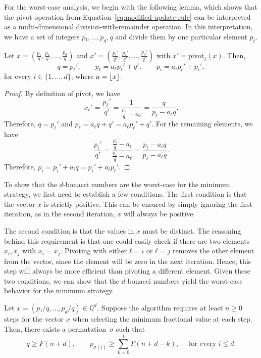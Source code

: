 For the worst-case analysis, we begin with the following lemma, which shows
that the $\mathrm{pivot}$ operation from Equation~\ref{eq:modified-update-rule}
can be interpreted as a multi-dimensional division-with-remainder operation.
In this interpretation, we have a set of integers $p₁, …, p_d, q$ and divide
them by one particular element $p_ℓ$.

\begin{lemma}
  \label{lem:divmod}
  Let $x = \left(\frac{p₁}{q}, \frac{p₂}{q}, …, \frac{p_d}{q}\right)$
  and $x' = \left(\frac{p₁'}{q'}, \frac{p₂'}{q'}, …, \frac{p_d'}{q'}\right)$
  with $x' = \mathrm{pivot}_ℓ(x)$.
  Then,
  \[
    q = p_ℓ', \qquad
    p_ℓ = a_ℓ p_ℓ' + q', \qquad
    p_i = a_i p_ℓ' + p_i',
  \]
  for every $i ∈ \{1, …, d\}$, where $a = \left\lfloor x\right\rfloor$.
\end{lemma}

\begin{proof}
  By definition of $\mathrm{pivot}$, we have
  \[
    x_ℓ'
    = \frac{p_ℓ'}{q'}
    = \frac{1}{\frac{p_ℓ}{q} - a_ℓ}
    = \frac{q}{p_ℓ - a_ℓ q}.
  \]
  Therefore, $q = p_ℓ'$ and $p_ℓ = a_ℓ q + q' = a_ℓ p_ℓ' + q'$.
  For the remaining elements, we have
  \[
    \frac{p_i'}{q'}
    = \frac{\frac{p_i}{q} - a_i}{\frac{p_ℓ}{q} - a_ℓ}
    = \frac{p_i - a_i q}{p_ℓ - a_ℓ q}.
  \]
  Therefore, $p_i = p_i' + a_i q = p_i' + a_i p_ℓ'$.
\end{proof}

To show that the $d$-bonacci numbers are the worst-case for the minimum
strategy, we first need to establish a few conditions.
The first condition is that the vector $x$ is strictly positive.
This can be ensured by simply ignoring the first iteration,
as in the second iteration, $x$ will always be positive.

The second condition is that the values in $x$ must be distinct.
The reasoning behind this requirement is that one could easily check if there
are two elements $x_i, x_j$ with $x_i = x_j$.
Pivoting with either $ℓ = i$ or $ℓ = j$ removes the other element from the
vector, since the element will be zero in the next iteration.
Hence, this step will always be more efficient than pivoting a different element.
Given these two conditions, we can show that the $d$-bonacci numbers
yield the worst-case behavior for the minimum strategy.

\begin{theorem}
  \label{thm:dbonacci}
  Let $x = (p₁/q, …, p_d/q) ∈ ℚ^d$.
  Suppose the algorithm requires at least $n ≥ 0$ steps for the vector $x$ when
  selecting the minimum fractional value at each step.
  Then, there exists a permutation~$σ$ such that
  \[
    q ≥ F(n+d), \qquad
    p_{σ(i)} ≥ \sum_{k = 0}^i F(n+d - k),
    \quad \text{ for every } i ≤ d.
  \]
\end{theorem}

